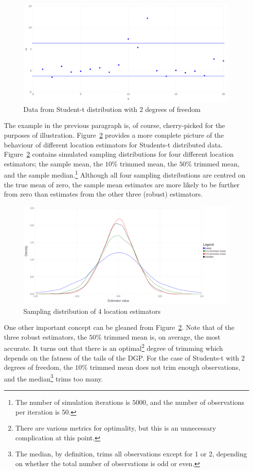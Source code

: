 \documentclass[12pt,a4paper]{amsart}
\begin{document}
\begin{figure}[htbp]
\centering
\includegraphics[height=5.35cm]{tDistDataCutoff.png}
\caption{\footnotesize{Data from Student-t distribution with 2 degrees of freedom}}
\label{figtDistDataCutoff}
\end{figure}


The example in the previous paragraph is, of course, cherry-picked for the purposes of illustration. Figure~\ref{figtDistDataEstDensity} provides a more complete picture of the behaviour of different location estimators for Students-t distributed data. Figure~\ref{figtDistDataEstDensity} contains simulated sampling distributions for four different location estimators; the sample mean, the $10$\% trimmed mean, the $50$\% trimmed mean, and the sample median.\footnote{The number of simulation iterations is $5000$, and the number of observations per iteration is 50.} Although all four sampling distributions are centred on the true mean of zero, the sample mean estimates are more likely to be further from zero than estimates from the other three (robust) estimators.

\begin{figure}[htbp]
\centering
\includegraphics[height=5.35cm]{tDistDataEstDensity.png}
\caption{\footnotesize{Sampling distribution of 4 location estimators}}
\label{figtDistDataEstDensity}
\end{figure}



One other important concept can be gleaned from Figure~\ref{figtDistDataEstDensity}. Note that of the three robust estimators, the $50$\% trimmed mean is, on average, the most accurate. It turns out that there is an optimal\footnote{There are various metrics for optimality, but this is an unnecessary complication at this point.} degree of trimming which depends on the fatness of the tails of the DGP. For the case of Students-t with 2 degrees of freedom, the $10$\% trimmed mean does not trim enough observations, and the median\footnote{The median, by definition, trims all observations except for 1 or 2, depending on whether the total number of observations is odd or even.} trims too many.
\end{document}
